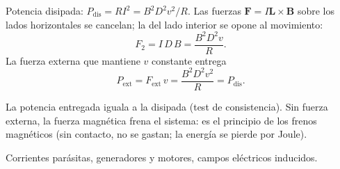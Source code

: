 \documentclass[12pt,a4paper]{article}
\begin{document}
Potencia disipada: $P_{\text{dis}} = R I^2 = B^2 D^2 v^2/R$. Las fuerzas
$\mathbf{F}=I\mathbf{L}\times\mathbf{B}$ sobre los lados horizontales se
cancelan; la del lado interior se opone al movimiento:
\[
F_2 = I\,D\,B = \frac{B^2 D^2 v}{R}.
\]
La fuerza externa que mantiene $v$ constante entrega
\[
P_{\text{ext}} = F_{\text{ext}}\,v = \frac{B^2 D^2 v^2}{R} = P_{\text{dis}}.
\]

\begin{notebox}
  La potencia entregada iguala a la disipada (test de consistencia). Sin fuerza
  externa, la fuerza magnética frena el sistema: es el principio de los frenos
  magnéticos (sin contacto, no se gastan; la energía se pierde por Joule).
\end{notebox}



\begin{notebox}
  Corrientes parásitas, generadores y motores, campos eléctricos inducidos.
\end{notebox}
\end{document}
